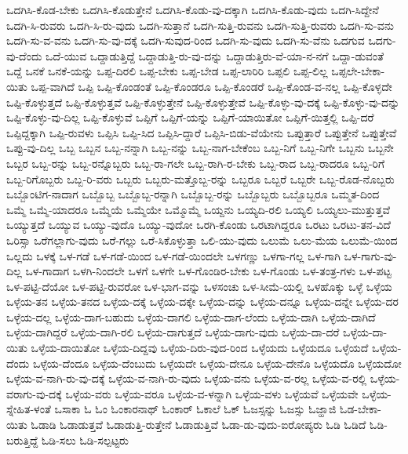 {ಒದಗಿಸಿ-ಕೊಡ-ಬೇಕು
ಒದಗಿಸಿ-ಕೊಡುತ್ತೇನೆ
ಒದಗಿಸಿ-ಕೊಡು-ವು-ದಕ್ಕಾಗಿ
ಒದಗಿಸಿ-ಕೊಡು-ವುದು
ಒದಗಿ-ಸಿದ್ದೇನೆ
ಒದಗಿ-ಸಿ-ರುವರು
ಒದಗಿ-ಸಿ-ರು-ವುದು
ಒದಗಿ-ಸುತ್ತಾನೆ
ಒದಗಿ-ಸುತ್ತಿ-ರುವನು
ಒದಗಿ-ಸುತ್ತಿ-ರುವರು
ಒದಗಿ-ಸು-ವನು
ಒದಗಿ-ಸು-ವ-ವನು
ಒದಗಿ-ಸು-ವು-ದಕ್ಕೆ
ಒದಗಿ-ಸುವುದ-ರಿಂದ
ಒದಗಿ-ಸು-ವುದು
ಒದಗಿ-ಸು-ವೆನು
ಒದಗುವ
ಒದಗು-ವು-ದೆಂದು
ಒದೆ-ಯುವ
ಒದ್ದಾಡುತ್ತಿದ್ದೆ
ಒದ್ದಾಡುತ್ತಿ-ರು-ವು-ದನ್ನು
ಒದ್ದಾಡುತ್ತಿರು-ವೆ-ಯಾ-ನ-ನಗೆ
ಒದ್ದಾ-ಡುವಂತೆ
ಒದ್ದೆ
ಒನಕೆ
ಒನಕೆ-ಯನ್ನು
ಒಪ್ಪ-ದಿರಲಿ
ಒಪ್ಪ-ಬೇಕು
ಒಪ್ಪ-ಬೇಡ
ಒಪ್ಪ-ಲಾರಿರಿ
ಒಪ್ಪಲಿ
ಒಪ್ಪ-ಲಿಲ್ಲ
ಒಪ್ಪಲೇ-ಬೇಕಾ-ಯಿತು
ಒಪ್ಪ-ವಾಗಿದೆ
ಒಪ್ಪಿ
ಒಪ್ಪಿ-ಕೊಂಡಂತೆ
ಒಪ್ಪಿ-ಕೊಂಡರೂ
ಒಪ್ಪಿ-ಕೊಂಡರೆ
ಒಪ್ಪಿ-ಕೊಂಡ-ವ-ನಲ್ಲ
ಒಪ್ಪಿ-ಕೊಳ್ಳದೇ
ಒಪ್ಪಿ-ಕೊಳ್ಳುತ್ತದೆ
ಒಪ್ಪಿ-ಕೊಳ್ಳುತ್ತವೆ
ಒಪ್ಪಿ-ಕೊಳ್ಳುತ್ತೇನೆ
ಒಪ್ಪಿ-ಕೊಳ್ಳುತ್ತೇವೆ
ಒಪ್ಪಿ-ಕೊಳ್ಳು-ವು-ದಕ್ಕೆ
ಒಪ್ಪಿ-ಕೊಳ್ಳು-ವು-ದನ್ನು
ಒಪ್ಪಿ-ಕೊಳ್ಳು-ವು-ದಿಲ್ಲ
ಒಪ್ಪಿ-ಕೊಳ್ಳುವೆ
ಒಪ್ಪಿಗೆ
ಒಪ್ಪಿಗೆ-ಯನ್ನು
ಒಪ್ಪಿಗೆ-ಯಾಯಿತೋ
ಒಪ್ಪಿಗೆ-ಯಿತ್ತಲ್ಲಿ
ಒಪ್ಪಿ-ದರೆ
ಒಪ್ಪಿದ್ದಕ್ಕಾಗಿ
ಒಪ್ಪಿ-ರುವಳು
ಒಪ್ಪಿಸಿ
ಒಪ್ಪಿ-ಸಿದ
ಒಪ್ಪಿಸಿ-ದ್ದಾರೆ
ಒಪ್ಪಿಸಿ-ಬಿಡು-ವೆಯೇನು
ಒಪ್ಪುತ್ತಾರೆ
ಒಪ್ಪುತ್ತೇನೆ
ಒಪ್ಪುತ್ತೇವೆ
ಒಪ್ಪು-ವು-ದಿಲ್ಲ
ಒಬ್ಬ
ಒಬ್ಬನ
ಒಬ್ಬ-ನನ್ನಾಗಿ
ಒಬ್ಬ-ನನ್ನು
ಒಬ್ಬ-ನಾಗ-ಬೇಕೆಂಬ
ಒಬ್ಬ-ನಿಗೆ
ಒಬ್ಬ-ನಿಗೇ
ಒಬ್ಬನು
ಒಬ್ಬನೇ
ಒಬ್ಬರ
ಒಬ್ಬ-ರನ್ನು
ಒಬ್ಬ-ರನ್ನೊಬ್ಬರು
ಒಬ್ಬ-ರಾ-ಗಲೇ
ಒಬ್ಬ-ರಾಗಿ-ರ-ಬೇಕು
ಒಬ್ಬ-ರಾದ
ಒಬ್ಬ-ರಾದರೂ
ಒಬ್ಬ-ರಿಗೆ
ಒಬ್ಬ-ರಿಗೊಬ್ಬರು
ಒಬ್ಬ-ರಿ-ವರು
ಒಬ್ಬರು
ಒಬ್ಬರು-ಮತ್ತೊಬ್ಬ-ರನ್ನು
ಒಬ್ಬರೂ
ಒಬ್ಬರೆ
ಒಬ್ಬರೇ
ಒಬ್ಬ-ರೊಡ-ನೊಬ್ಬರು
ಒಬ್ಬೊಂಟಿಗ-ನಾದಾಗ
ಒಬ್ಬೊಬ್ಬ
ಒಬ್ಬೊಬ್ಬ-ರನ್ನಾಗಿ
ಒಬ್ಬೊಬ್ಬ-ರನ್ನು
ಒಬ್ಬೊಬ್ಬರು
ಒಬ್ಬೊಬ್ಬರೂ
ಒಮ್ಮತ-ದಿಂದ
ಒಮ್ಮೆ
ಒಮ್ಮೆ-ಯಾದರೂ
ಒಮ್ಮೆಯೆ
ಒಮ್ಮೆಯೇ
ಒಮ್ಮೊಮ್ಮೆ
ಒಯ್ದನು
ಒಯ್ಯದಿ-ರಲಿ
ಒಯ್ಯಲಿ
ಒಯ್ಯಲು-ಮುತ್ತುತ್ತವೆ
ಒಯ್ಯುತ್ತದೆ
ಒಯ್ಯುವ
ಒಯ್ಯು-ವುದೊ
ಒಯ್ಯು-ವುದೋ
ಒರಗಿ-ಕೊಂಡು
ಒರಟಾಗಿದ್ದರೂ
ಒರಟು
ಒರಟು-ತನ-ವಿದೆ
ಒರಿಸ್ಸಾ
ಒರೆಗಲ್ಲಾಗು-ವುದು
ಒರೆ-ಗಲ್ಲು
ಒರೆ-ಸಿಕೊಳ್ಳುತ್ತಾ
ಒಲಿ-ಯು-ವುದು
ಒಲುಮೆ
ಒಲು-ಮೆಯ
ಒಲುಮೆ-ಯಿಂದ
ಒಲ್ಲದು
ಒಳಕ್ಕೆ
ಒಳ-ಗಡೆ
ಒಳ-ಗಡೆ-ಯಿಂದ
ಒಳ-ಗಡೆ-ಯಿಂದಲೇ
ಒಳಗಣ್ಣು
ಒಳಗಾ-ಗಲ್ಲ
ಒಳ-ಗಾಗಿ
ಒಳ-ಗಾಗು-ವು-ದಿಲ್ಲ
ಒಳ-ಗಾದಾಗ
ಒಳಗಿ-ನಿಂದಲೇ
ಒಳಗೆ
ಒಳಗೇ
ಒಳ-ಗೊಂಡಿರ-ಬೇಕು
ಒಳ-ಗೊಂಡು
ಒಳ-ತಂತ್ರ-ಗಳು
ಒಳ-ಪಟ್ಟ
ಒಳ-ಪಟ್ಟಿ-ದೆಯೋ
ಒಳ-ಪಟ್ಟಿ-ರುವರೋ
ಒಳ-ಭಾಗ-ವನ್ನು
ಒಳಸಂಚು
ಒಳ-ಸೀಮೆ-ಯಲ್ಲಿ
ಒಳಹೊಕ್ಕು
ಒಳ್ಳೆ
ಒಳ್ಳೆಯ
ಒಳ್ಳೆಯ-ತನ
ಒಳ್ಳೆಯ-ತನದ
ಒಳ್ಳೆಯ-ದಕ್ಕೆ
ಒಳ್ಳೆಯ-ದಕ್ಕೇ
ಒಳ್ಳೆಯ-ದನ್ನು
ಒಳ್ಳೆಯ-ದನ್ನೂ
ಒಳ್ಳೆಯ-ದನ್ನೇ
ಒಳ್ಳೆಯ-ದರ
ಒಳ್ಳೆಯ-ದಲ್ಲ
ಒಳ್ಳೆಯ-ದಾಗ-ಬಹುದು
ಒಳ್ಳೆಯ-ದಾಗಲಿ
ಒಳ್ಳೆಯ-ದಾಗ-ಲೆಂದು
ಒಳ್ಳೆಯ-ದಾಗಿ
ಒಳ್ಳೆಯ-ದಾಗಿದೆ
ಒಳ್ಳೆಯ-ದಾಗಿದ್ದರೆ
ಒಳ್ಳೆಯ-ದಾಗಿ-ರಲಿ
ಒಳ್ಳೆಯ-ದಾಗುತ್ತದೆ
ಒಳ್ಳೆಯ-ದಾಗು-ವುದು
ಒಳ್ಳೆಯ-ದಾ-ದರೆ
ಒಳ್ಳೆಯ-ದಾ-ಯಿತು
ಒಳ್ಳೆಯ-ದಾಯಿತೋ
ಒಳ್ಳೆಯ-ದಿದ್ದವು
ಒಳ್ಳೆಯ-ದಿರು-ವುದ-ರಿಂದ
ಒಳ್ಳೆಯದು
ಒಳ್ಳೆಯದೂ
ಒಳ್ಳೆಯದೆ
ಒಳ್ಳೆಯ-ದೆಂದು
ಒಳ್ಳೆಯ-ದೆಂದೂ
ಒಳ್ಳೆಯ-ದೆಂಬುದು
ಒಳ್ಳೆಯದೇ
ಒಳ್ಳೆಯ-ದೇನೂ
ಒಳ್ಳೆಯ-ದೇನೊ
ಒಳ್ಳೆಯದೊ
ಒಳ್ಳೆಯದೋ
ಒಳ್ಳೆಯ-ವ-ನಾಗಿ-ರು-ವು-ದಕ್ಕೆ
ಒಳ್ಳೆಯ-ವ-ನಾಗಿ-ರು-ವುದು
ಒಳ್ಳೆಯ-ವನು
ಒಳ್ಳೆಯ-ವ-ರಲ್ಲ
ಒಳ್ಳೆಯ-ವ-ರಲ್ಲಿ
ಒಳ್ಳೆಯ-ವರಾಗು-ವು-ದಕ್ಕೆ
ಒಳ್ಳೆಯ-ವರು
ಒಳ್ಳೆಯ-ವರೂ
ಒಳ್ಳೆಯ-ವ-ಳನ್ನಾಗಿ
ಒಳ್ಳೆಯ-ವಳು
ಒಳ್ಳೆಯವೆ
ಒಳ್ಳೆಯವೇ
ಒಳ್ಳೆಯ-ಸ್ನೇಹಿತ-ಳಂತೆ
ಒಸಾಕಾ
ಓ
ಓಂ
ಓಂಕಾರನಾಥ್
ಓಂಕಾರ್
ಓಕಾಲೆ
ಓಕ್
ಓಜಸ್ಸನ್ನು
ಓಜಸ್ಸು
ಓಜ್ಹಾಜಿ
ಓಡ-ಬೇಕಾ-ಯಿತು
ಓಡಾಡಿ
ಓಡಾಡುತ್ತವೆ
ಓಡಾಡುತ್ತಿ-ರುತ್ತೇನೆ
ಓಡಾಡುತ್ತಿವೆ
ಓಡಾ-ಡು-ವುದು-ಐರೋಪ್ಯರು
ಓಡಿ
ಓಡಿದೆ
ಓಡಿ-ಬರುತ್ತಿದ್ದೆ
ಓಡಿ-ಸಲು
ಓಡಿ-ಸಲ್ಪಟ್ಟರು
}
